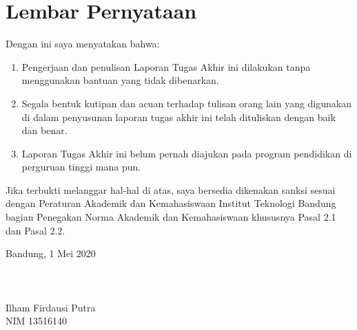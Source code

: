 \clearpage

\chapter*{Lembar Pernyataan}

Dengan ini saya menyatakan bahwa:

\begin{enumerate}

    \item Pengerjaan dan penulisan Laporan Tugas Akhir ini dilakukan tanpa menggunakan bantuan yang tidak dibenarkan.
    \item Segala bentuk kutipan dan acuan terhadap tulisan orang lain yang digunakan di dalam penyusunan laporan tugas akhir ini telah dituliskan dengan baik dan benar.
    \item Laporan Tugas Akhir ini belum pernah diajukan pada program pendidikan di perguruan tinggi mana pun.

\end{enumerate}

Jika terbukti melanggar hal-hal di atas, saya bersedia dikenakan sanksi sesuai dengan Peraturan Akademik dan Kemahasiswaan Institut Teknologi Bandung bagian Penegakan Norma Akademik dan Kemahasiswaan khususnya Pasal 2.1 dan Pasal 2.2.
\vspace{15mm}

Bandung, 1 Mei 2020 \\
\\
\\
\\
Ilham Firdausi Putra \\
NIM 13516140

\clearpage